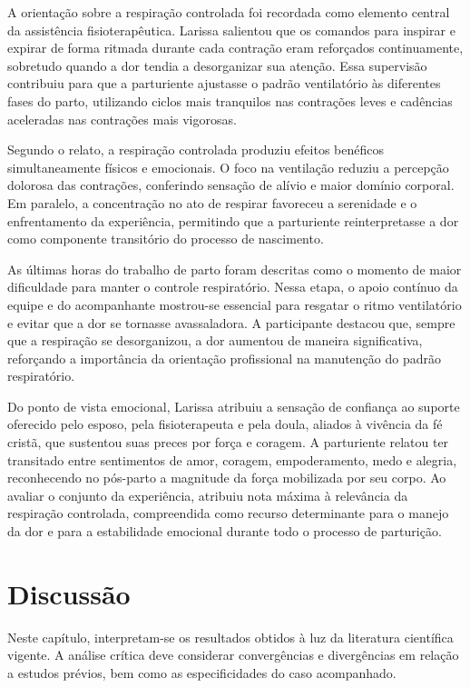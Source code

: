 \documentclass[openright]{normas-utf-tex}
\begin{document}
A orientação sobre a respiração controlada foi recordada como elemento central da assistência fisioterapêutica. Larissa salientou que os comandos para inspirar e expirar de forma ritmada durante cada contração eram reforçados continuamente, sobretudo quando a dor tendia a desorganizar sua atenção. Essa supervisão contribuiu para que a parturiente ajustasse o padrão ventilatório às diferentes fases do parto, utilizando ciclos mais tranquilos nas contrações leves e cadências aceleradas nas contrações mais vigorosas.

Segundo o relato, a respiração controlada produziu efeitos benéficos simultaneamente físicos e emocionais. O foco na ventilação reduziu a percepção dolorosa das contrações, conferindo sensação de alívio e maior domínio corporal. Em paralelo, a concentração no ato de respirar favoreceu a serenidade e o enfrentamento da experiência, permitindo que a parturiente reinterpretasse a dor como componente transitório do processo de nascimento.

As últimas horas do trabalho de parto foram descritas como o momento de maior dificuldade para manter o controle respiratório. Nessa etapa, o apoio contínuo da equipe e do acompanhante mostrou-se essencial para resgatar o ritmo ventilatório e evitar que a dor se tornasse avassaladora. A participante destacou que, sempre que a respiração se desorganizou, a dor aumentou de maneira significativa, reforçando a importância da orientação profissional na manutenção do padrão respiratório.

Do ponto de vista emocional, Larissa atribuiu a sensação de confiança ao suporte oferecido pelo esposo, pela fisioterapeuta e pela doula, aliados à vivência da fé cristã, que sustentou suas preces por força e coragem. A parturiente relatou ter transitado entre sentimentos de amor, coragem, empoderamento, medo e alegria, reconhecendo no pós-parto a magnitude da força mobilizada por seu corpo. Ao avaliar o conjunto da experiência, atribuiu nota máxima à relevância da respiração controlada, compreendida como recurso determinante para o manejo da dor e para a estabilidade emocional durante todo o processo de parturição.

\chapter{Discussão}
\label{chap:discussao}

Neste capítulo, interpretam-se os resultados obtidos à luz da literatura científica vigente. A análise crítica deve considerar convergências e divergências em relação a estudos prévios, bem como as especificidades do caso acompanhado.
\end{document}

